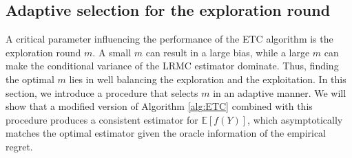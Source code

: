 \documentclass[a4paper,11pt]{article}
\numberwithin{equation}{section}
\theoremstyle{plain}
\theoremstyle{definition}
\def\E{{\mathbb E}}
\def\ext{{\text{ept}}}
\def\mse{{\textsf{MSE}}}
\def\lrmc{{\textsf{LRMC}}}
\DeclareMathOperator*{\argmin}{arg\,min}
\begin{document}

\subsection{Adaptive selection for the exploration round}\label{adpp}

A critical parameter influencing the performance of the ETC algorithm is the exploration round $m$. 
A small $m$ can result in a large bias, while a large $m$ can make the conditional variance of the LRMC estimator dominate.
Thus, finding the optimal $m$ lies in well balancing the exploration and the exploitation.   
In this section, we introduce a procedure that selects $m$ in an adaptive manner. 
We will show that a modified version of Algorithm \ref{alg:ETC} combined with this procedure produces a consistent estimator for $\E[f(Y)]$, which asymptotically matches the optimal estimator given the oracle information of the empirical regret.    
\end{document}
